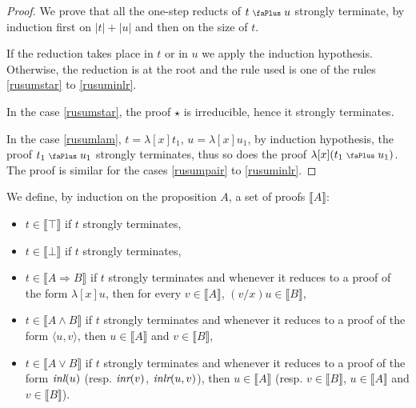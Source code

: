 \documentclass[screen, sigconf,authorversion,nonacm]{acmart}
\theoremstyle{acmdefinition}
\numberwithin{equation}{section}
\newcommand\abstr[1]{[#1]}
\newcommand\inl{\mbox{\it inl}}
\newcommand\inr{\mbox{\it inr}}
\newcommand\inlr{\mbox{\it inlr}}
\newcommand\plus{\mathrel{\text{\normalfont\scalebox{0.7}{\faPlus}}}}
\newcommand\pair[2]{\langle #1, #2 \rangle}
\begin{document}
\begin{proof}
We prove that all the one-step reducts of $t \plus u$ strongly
 terminate, by induction first on $|t| + |u|$ and then on the size of
$t$.

If the reduction takes place in $t$ or in $u$ we apply the induction
hypothesis.
Otherwise, the reduction is at the root and the rule used is one of
the rules
\eqref{rusumstar} to \eqref{rusuminlr}.

In the case \eqref{rusumstar}, the proof $\star$ is irreducible,
hence it strongly terminates.

In the case \eqref{rusumlam}, $t = \lambda \abstr{x} t_1$, $u =
\lambda \abstr{x} u_1$, by induction hypothesis, the proof $t_1 \plus
u_1$ strongly terminates, thus so does the proof $\lambda
\abstr{x}(t_1 \plus u_1)$.  The proof is similar for the cases
\eqref{rusumpair} to \eqref{rusuminlr}.  \qedhere
\end{proof}

\begin{definition}
\label{def:interpretation}
We define, by induction on the proposition $A$, a set of proofs
$\llbracket A \rrbracket$:
\begin{itemize}
\item $t \in \llbracket \top \rrbracket$ if $t$ strongly terminates,

\item $t \in \llbracket \bot \rrbracket$ if $t$ strongly terminates,

\item $t \in \llbracket A \Rightarrow B \rrbracket$ if $t$ strongly
  terminates and whenever it reduces to a proof of the form $\lambda
  \abstr{x}u$, then for every $v \in \llbracket A \rrbracket$, $(v/x)u \in
  \llbracket B \rrbracket$,

\item $t \in \llbracket A \wedge B \rrbracket$ if $t$ strongly
  terminates and whenever it reduces to a proof of the form
  $\pair{u}{v}$, then $u \in \llbracket A \rrbracket$ and $v \in \llbracket
  B \rrbracket$,

\item $t \in \llbracket A \vee B \rrbracket$ if $t$ strongly
  terminates and whenever it reduces to a proof of the form
  $\inl(u)$ (resp. $\inr(v)$, $\inlr(u,v)$), then $u \in
  \llbracket A \rrbracket$ (resp. $v \in \llbracket B \rrbracket$,
$u \in \llbracket A \rrbracket$ and $v \in \llbracket B \rrbracket$).
\end{itemize}
\end{definition}
\end{document}
